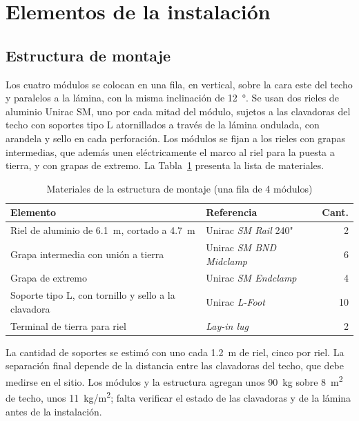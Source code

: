 \section{Elementos de la instalación}\label{sec:instalacion}

\subsection{Estructura de montaje}

Los cuatro módulos se colocan en una fila, en vertical, sobre la cara este del techo y paralelos a la lámina, con la misma inclinación de \SI{12}{\degree}. Se usan dos rieles de aluminio Unirac SM, uno por cada mitad del módulo, sujetos a las clavadoras del techo con soportes tipo L atornillados a través de la lámina ondulada, con arandela y sello en cada perforación. Los módulos se fijan a los rieles con grapas intermedias, que además unen eléctricamente el marco al riel para la puesta a tierra, y con grapas de extremo. La Tabla~\ref{tab:montaje} presenta la lista de materiales.

\begin{table}[!htb]
\caption{Materiales de la estructura de montaje (una fila de 4 módulos)}
\label{tab:montaje}
\centering
\footnotesize
\setlength{\tabcolsep}{3pt}
\begin{tabular}{l l r}
\toprule
Elemento & Referencia & Cant. \\
\midrule
Riel de aluminio de \SI{6.1}{m}, cortado a \SI{4.7}{m} & Unirac \textit{SM Rail} 240" & 2 \\
Grapa intermedia con unión a tierra & Unirac \textit{SM BND Midclamp} & 6 \\
Grapa de extremo & Unirac \textit{SM Endclamp} & 4 \\
Soporte tipo L, con tornillo y sello a la clavadora & Unirac \textit{L-Foot} & 10 \\
Terminal de tierra para riel & \textit{Lay-in lug} & 2 \\
\bottomrule
\end{tabular}
\end{table}

La cantidad de soportes se estimó con uno cada \SI{1.2}{m} de riel, cinco por riel. La separación final depende de la distancia entre las clavadoras del techo, que debe medirse en el sitio. Los módulos y la estructura agregan unos \SI{90}{kg} sobre \SI{8}{m^2} de techo, unos \SI{11}{kg/m^2}; falta verificar el estado de las clavadoras y de la lámina antes de la instalación.

